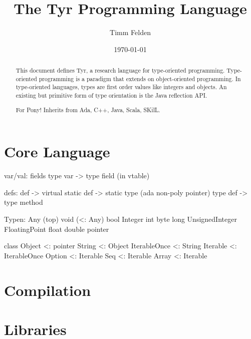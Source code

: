 \documentclass[a4paper,10pt]{article}
\title{The Tyr Programming Language}
\author{Timm Felden}
\date{\today}
\begin{document}
\maketitle

\begin{abstract}
This document defines Tyr, a research language for type-oriented programming.
Type-oriented programming is a paradigm that extends on object-oriented programming.
In type-oriented languages, types are first order values like integers and objects.
An existing but primitive form of type orientation is the Java reflection API.
\end{abstract}

\renewcommand{\abstractname}{Acknowledgements}
\begin{abstract}
For Pony!
Inherits from Ada, C++, Java, Scala, SKilL.
\end{abstract}

\tableofcontents

\newpage
\part{Core Language}
\label{part:spec}








var/val:
  fields
  type var -> type field (in vtable)

defs:
 def -> virtual
 static def -> static type (ada non-poly pointer)
 type def -> type method


Typen:
 Any (top)
 void (<: Any)
 bool
 Integer
 int
 byte
 long
 UnsignedInteger
 FloatingPoint
 float
 double
 pointer
 
class Object <: pointer
  String <: Object
  IterableOnce <: String
  Iterable <: IterableOnce
  Option <: Iterable
  Seq <: Iterable
  Array <: Iterable


\part{Compilation}





\part{Libraries}
\end{document}
